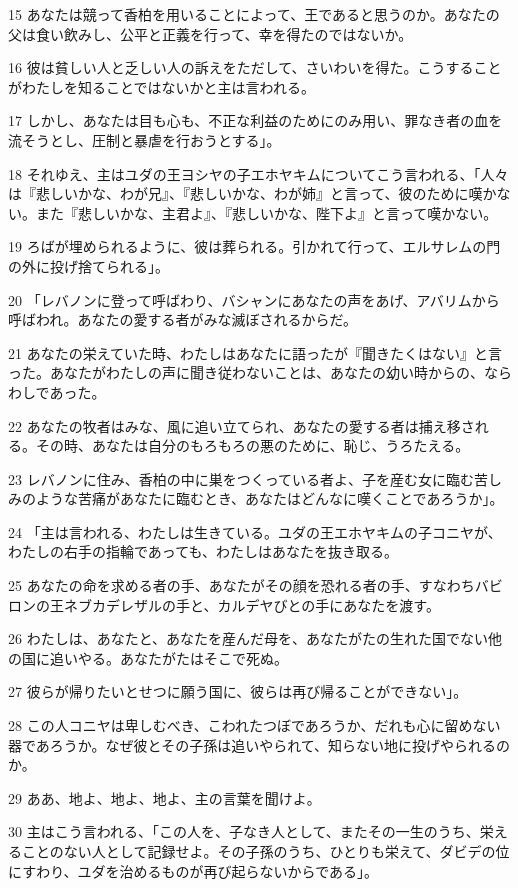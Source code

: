 \par 15 あなたは競って香柏を用いることによって、王であると思うのか。あなたの父は食い飲みし、公平と正義を行って、幸を得たのではないか。
\par 16 彼は貧しい人と乏しい人の訴えをただして、さいわいを得た。こうすることがわたしを知ることではないかと主は言われる。
\par 17 しかし、あなたは目も心も、不正な利益のためにのみ用い、罪なき者の血を流そうとし、圧制と暴虐を行おうとする」。
\par 18 それゆえ、主はユダの王ヨシヤの子エホヤキムについてこう言われる、「人々は『悲しいかな、わが兄』、『悲しいかな、わが姉』と言って、彼のために嘆かない。また『悲しいかな、主君よ』、『悲しいかな、陛下よ』と言って嘆かない。
\par 19 ろばが埋められるように、彼は葬られる。引かれて行って、エルサレムの門の外に投げ捨てられる」。
\par 20 「レバノンに登って呼ばわり、バシャンにあなたの声をあげ、アバリムから呼ばわれ。あなたの愛する者がみな滅ぼされるからだ。
\par 21 あなたの栄えていた時、わたしはあなたに語ったが『聞きたくはない』と言った。あなたがわたしの声に聞き従わないことは、あなたの幼い時からの、ならわしであった。
\par 22 あなたの牧者はみな、風に追い立てられ、あなたの愛する者は捕え移される。その時、あなたは自分のもろもろの悪のために、恥じ、うろたえる。
\par 23 レバノンに住み、香柏の中に巣をつくっている者よ、子を産む女に臨む苦しみのような苦痛があなたに臨むとき、あなたはどんなに嘆くことであろうか」。
\par 24 「主は言われる、わたしは生きている。ユダの王エホヤキムの子コニヤが、わたしの右手の指輪であっても、わたしはあなたを抜き取る。
\par 25 あなたの命を求める者の手、あなたがその顔を恐れる者の手、すなわちバビロンの王ネブカデレザルの手と、カルデヤびとの手にあなたを渡す。
\par 26 わたしは、あなたと、あなたを産んだ母を、あなたがたの生れた国でない他の国に追いやる。あなたがたはそこで死ぬ。
\par 27 彼らが帰りたいとせつに願う国に、彼らは再び帰ることができない」。
\par 28 この人コニヤは卑しむべき、こわれたつぼであろうか、だれも心に留めない器であろうか。なぜ彼とその子孫は追いやられて、知らない地に投げやられるのか。
\par 29 ああ、地よ、地よ、地よ、主の言葉を聞けよ。
\par 30 主はこう言われる、「この人を、子なき人として、またその一生のうち、栄えることのない人として記録せよ。その子孫のうち、ひとりも栄えて、ダビデの位にすわり、ユダを治めるものが再び起らないからである」。

